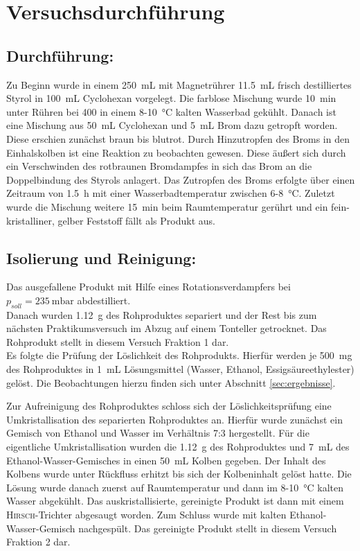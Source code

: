 \newpage
\section{Versuchsdurchführung}
\label{sec:durchfuerung}


\subsection*{Durchführung:}
Zu Beginn wurde in einem \SI{250}{\milli \liter} mit Magnetrührer \SI{11,5}{\milli \liter} frisch destilliertes Styrol in \SI{100}{\milli \liter} Cyclohexan vorgelegt. Die farblose Mischung wurde \SI{10}{\minute} unter Rühren bei \SI{400}{\rpm} in einem 8-\SI{10}{\celsius} kalten Wasserbad gekühlt. Danach ist eine Mischung aus \SI{50}{\milli \liter} Cyclohexan und \SI{5}{\milli \liter} Brom dazu getropft worden. Diese erschien zunächst braun bis blutrot. Durch Hinzutropfen des Broms in den Einhalskolben ist eine Reaktion zu beobachten gewesen. Diese äußert sich durch ein Verschwinden des rotbraunen Bromdampfes in sich das Brom an die Doppelbindung des Styrols anlagert. Das Zutropfen des Broms erfolgte über einen Zeitraum von \SI{1,5}{\hour} mit einer Wasserbadtemperatur zwischen 6-\SI{8}{\celsius}. Zuletzt wurde die Mischung weitere \SI{15}{\minute} beim Raumtemperatur gerührt und ein fein-kristalliner, gelber Feststoff fällt als Produkt aus.

\subsection*{Isolierung und Reinigung:}
Das ausgefallene Produkt mit Hilfe eines Rotationsverdampfers bei $p_{soll}=\SI{235}{\milli \bar}$ abdestilliert.\\
Danach wurden \SI{1,12}{\gram} des Rohproduktes separiert und der Rest bis zum nächsten Praktikumsversuch im Abzug auf einem Tonteller getrocknet. Das Rohprodukt stellt in diesem Versuch Fraktion 1 dar.\\
Es folgte die Prüfung der Löslichkeit des Rohprodukts. Hierfür werden je \SI{500}{\milli \gram} des Rohproduktes in \SI{1}{\milli \liter} Lösungsmittel (Wasser, Ethanol, Essigsäureethylester) gelöst. Die Beobachtungen hierzu finden sich unter Abschnitt \ref{sec:ergebnisse}.

Zur Aufreinigung des Rohproduktes schloss sich der Löslichkeitsprüfung eine Umkristallisation des separierten Rohproduktes an. Hierfür wurde zunächst ein Gemisch von Ethanol und Wasser im Verhältnis 7:3 hergestellt. Für die eigentliche Umkristallisation wurden die \SI{1,12}{\gram} des Rohproduktes und \SI{7}{\milli \liter} des Ethanol-Wasser-Gemisches in einen \SI{50}{\milli \liter} Kolben gegeben. Der Inhalt des Kolbens wurde unter Rückfluss erhitzt bis sich der Kolbeninhalt gelöst hatte. Die Lösung wurde danach zuerst auf Raumtemperatur und dann im 8-\SI{10}{\celsius} kalten Wasser abgekühlt. Das auskristallisierte, gereinigte Produkt ist dann mit einem \textsc{Hirsch}-Trichter abgesaugt worden. Zum Schluss wurde mit kalten Ethanol-Wasser-Gemisch nachgespült. Das gereinigte Produkt stellt in diesem Versuch Fraktion 2 dar.

